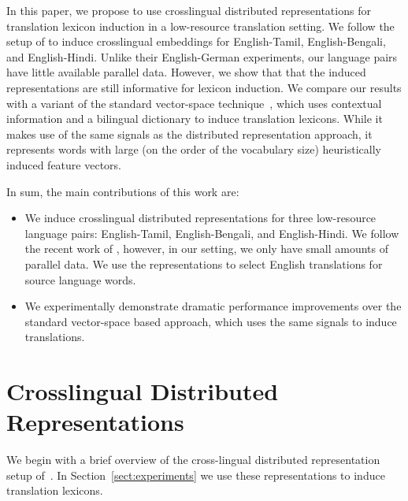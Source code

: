 \documentclass[11pt]{article}
\newcommand{\secref}[1]{Section~\ref{#1}}
\begin{document}
In this paper, we propose to use crosslingual distributed representations for translation lexicon induction in a low-resource translation setting.  We follow the setup of  to induce crosslingual embeddings for English-Tamil, English-Bengali, and English-Hindi.  Unlike their English-German experiments, our language pairs have little available parallel data.  However, we show that that the induced representations are still informative for lexicon induction.  
We compare our results with a variant of the standard vector-space technique~\cite{fung98}, which uses contextual information and a bilingual dictionary to induce translation lexicons.  
While it makes use of the same signals as the distributed representation approach, it represents words with large (on the order of the vocabulary size) heuristically induced feature vectors.

In sum, the main contributions of this work are:

\begin{itemize}
  \item We induce crosslingual distributed representations for three low-resource language pairs: English-Tamil, English-Bengali, and English-Hindi.  We follow the recent work of , however, in our setting, we only have small amounts of parallel data. We use the representations to select English translations for source language words.
  \item We experimentally demonstrate dramatic performance improvements over the standard vector-space based approach, which uses the same signals to induce translations.
\end{itemize}

\section{Crosslingual Distributed Representations} \label{sect:background}

We begin with a brief overview of the cross-lingual distributed representation setup of~. In \secref{sect:experiments} we use these representations to induce translation lexicons. 
\end{document}
